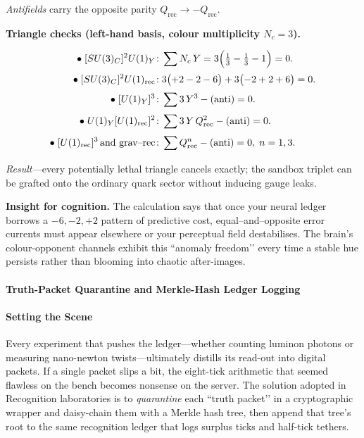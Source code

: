 \documentclass[11pt,oneside]{book}
\begin{document}
{\textit{Antifields} carry the opposite parity \(Q_{\text{rec}}\to -Q_{\text{rec}}\).

\bigskip
\textbf{Triangle checks (left-hand basis, colour multiplicity \(N_{c}=3\)).}

\[
\begin{aligned}
\bullet\;[SU(3)_{C}]^{2} U(1)_{Y}\!:&\;
   \sum  N_{c} \,Y 
   = 3\Bigl(\tfrac13-\tfrac13-1\Bigr)=0 .
\\[2pt]
\bullet\;[SU(3)_{C}]^{2} U(1)_{\text{rec}}\!:&\;
   3\bigl(+2-2-6\bigr)+
   3\bigl(-2+2+6\bigr)=0 .
\\[2pt]
\bullet\;[U(1)_{Y}]^{3}\!:&\;
   \sum 3\,Y^{3}-(\text{anti}) = 0 .
\\[2pt]
\bullet\; U(1)_{Y}[U(1)_{\text{rec}}]^{2}\!:&\;
   \sum 3\,Y\,Q_{\text{rec}}^{2}-(\text{anti})=0 .
\\[2pt]
\bullet\;[U(1)_{\text{rec}}]^{3}\!\text{ and grav–rec}\!:&\;
   \sum Q_{\text{rec}}^{n}-(\text{anti})=0,\; n=1,3 .
\end{aligned}
\]

\textit{Result—}every potentially lethal triangle cancels exactly; the
sandbox triplet can be grafted onto the ordinary quark sector without
inducing gauge leaks.

\bigskip
\textbf{Insight for cognition.}  
The calculation says that once your neural ledger borrows a
\(-6,-2,+2\) pattern of predictive cost, equal–and–opposite error
currents must appear elsewhere or your perceptual field destabilises.
The brain’s colour-opponent channels exhibit this “anomaly freedom’’ every
time a stable hue persists rather than blooming into chaotic after-images.

\bigskip

\paragraph*{Truth-Packet Quarantine and Merkle-Hash Ledger Logging}
\label{sec:truth-packet}

\paragraph{Setting the Scene}

Every experiment that pushes the ledger—whether counting luminon photons
or measuring nano-newton twists—ultimately distills its read-out into
digital packets.  
If a single packet slips a bit, the eight-tick arithmetic that seemed
flawless on the bench becomes nonsense on the server.  
The solution adopted in Recognition laboratories is to
\emph{quarantine} each “truth packet’’ in a cryptographic wrapper and
daisy-chain them with a Merkle hash tree, then append that tree’s root
to the same recognition ledger that logs surplus ticks and half-tick
tethers.

}
\end{document}
